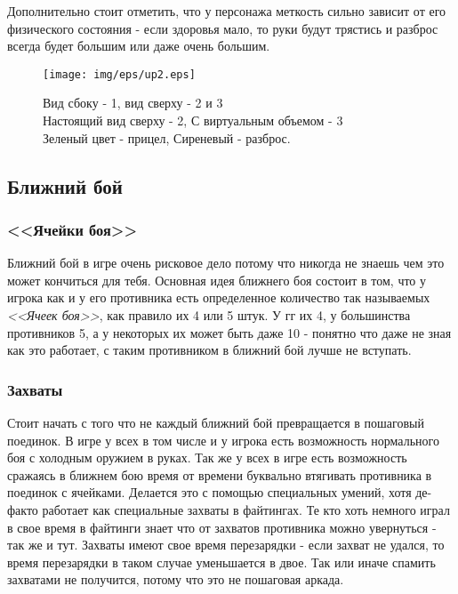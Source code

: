 \documentclass[11pt]{report}
\begin{document}
Дополнительно стоит отметить, что у персонажа меткость сильно зависит от его физического состояния - если здоровья мало, то руки будут трястись и разброс всегда будет большим или даже очень большим.

\begin{figure}
	\centering
	\texttt{[image: img/eps/up2.eps]}
	\caption{Вид сбоку - 1, вид сверху - 2 и 3 \\ Настоящий вид сверху - 2,  С виртуальным объемом - 3\\ Зеленый цвет - прицел, Сиреневый - разброс.}
	\label{img:layers}
\end{figure}



\subsection{Ближний бой}
\subsubsection{<<Ячейки боя>>}
Ближний бой в игре очень рисковое дело потому что никогда не знаешь чем это может кончиться для тебя. Основная идея ближнего боя состоит в том, что у игрока как и у его противника есть определенное количество так называемых \textit{<<Ячеек боя>>}, как правило их 4 или 5 штук. У гг их 4, у большинства противников 5, а у некоторых их может быть даже 10 - понятно что даже не зная как это работает, с таким противником в ближний бой лучше не вступать. 

\subsubsection{Захваты}
Стоит начать с того что не каждый ближний бой превращается в пошаговый поединок. В игре у всех в том числе и у игрока есть возможность нормального боя с холодным оружием в руках. Так же у всех в игре есть возможность сражаясь в ближнем бою время от времени буквально втягивать противника в поединок с ячейками. Делается это с помощью специальных умений, хотя де-факто работает как специальные захваты в файтингах. Те кто хоть немного играл в свое время в файтинги знает что от захватов противника можно увернуться - так же и тут. Захваты имеют свое время перезарядки - если захват не удался, то время перезарядки в таком случае уменьшается в двое. Так или иначе спамить захватами не получится, потому что это не пошаговая аркада.
\end{document}
